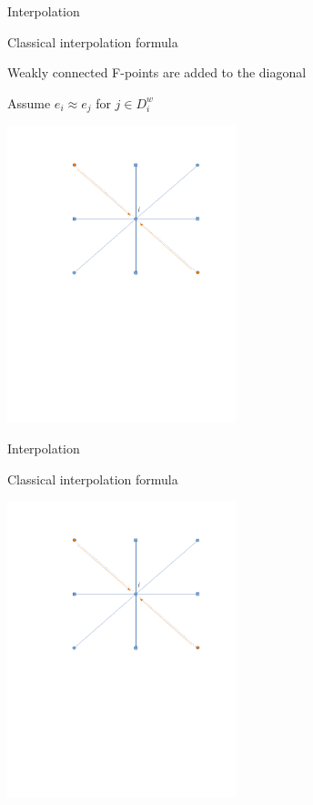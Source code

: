 \documentclass[18pt,xcolor=table]{beamer}
\begin{document}
\begin{frame}{Interpolation}
\begin{block}{Classical interpolation formula}
\bit
\item Weakly connected F-points are added to the diagonal
\item Assume $e_i\approx e_j$ for $j\in D^w_i$
\eit
\end{block}
\begin{center}
\includegraphics[width=0.5\textwidth]{../figures/interpStencilWeakF}
\end{center}
\end{frame}

\begin{frame}{Interpolation}
\begin{block}{Classical interpolation formula}
\end{block}
\begin{center}
\includegraphics[width=0.5\textwidth]{../figures/interpStencilWeakF}
\end{center}
\end{frame}
\end{document}

